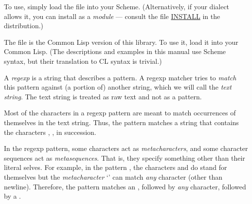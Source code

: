 \ifx\MzLibManual\Undefined
To use, simply load the file  into
your Scheme.
(Alternatively, if your dialect allows it, you can
install  as a {\em module} --- consult
the file \url{INSTALL} in the distribution.)

The file  is the Common Lisp version
of this library.  To use it, load it into your Common Lisp.
(The descriptions and examples in this manual use Scheme
syntax, but their
translation to CL syntax is trivial.)

\htmlonly


\tableofcontents
\endhtmlonly
\fi


A {\em regexp} is a string that describes a pattern.  A
regexp matcher tries to {\em match} this pattern
against (a portion of) another string, which we
will call the {\em text string}.  The text string
is treated as raw text and not as a pattern.

Most of the characters in a regexp pattern are meant to
match occurrences of themselves in the text string.
Thus, the pattern  matches a string that
contains the characters , ,  in succession.

In the regexp pattern, some characters  act as {\em
metacharacters}, and some character sequences act as
{\em metasequences}.  That is, they specify something
other than their literal selves.  For example, in the
pattern , the characters  and  do
stand for themselves but the {\em metacharacter} `'
can match {\em any} character (other than
newline).  Therefore, the pattern 
matches an , followed by {\em any} character,
followed by a .

